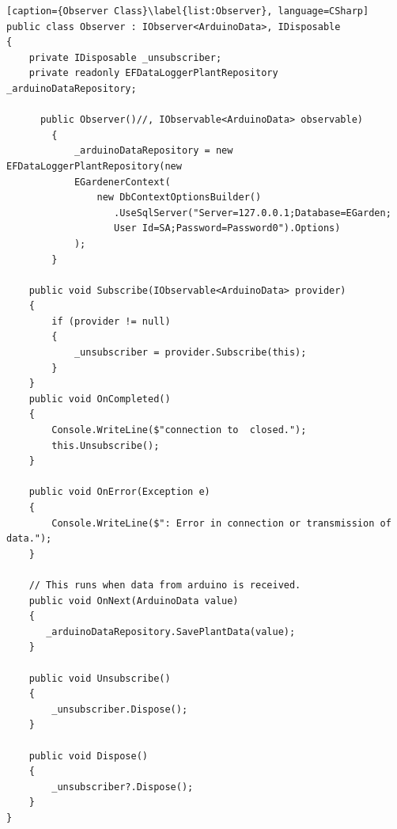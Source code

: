 \documentclass[a4paper,12pt,twoside,openright,titlepage]{book}
\begin{document}
\begin{lstlisting}[caption={Observer Class}\label{list:Observer}, language=CSharp]
public class Observer : IObserver<ArduinoData>, IDisposable
{
	private IDisposable _unsubscriber;
    private readonly EFDataLoggerPlantRepository _arduinoDataRepository;

	  public Observer()//, IObservable<ArduinoData> observable)
        {
            _arduinoDataRepository = new EFDataLoggerPlantRepository(new
            EGardenerContext(
                new DbContextOptionsBuilder()
                   .UseSqlServer("Server=127.0.0.1;Database=EGarden;
                   User Id=SA;Password=Password0").Options)
            );
        }

	public void Subscribe(IObservable<ArduinoData> provider)
    {
		if (provider != null)
		{	     
	        _unsubscriber = provider.Subscribe(this);
        }
	}
	public void OnCompleted()
    {
		Console.WriteLine($"connection to  closed.");
	    this.Unsubscribe();
    }

	public void OnError(Exception e)
	{
        Console.WriteLine($": Error in connection or transmission of data.");
	}

    // This runs when data from arduino is received.
	public void OnNext(ArduinoData value)
    {
       _arduinoDataRepository.SavePlantData(value);
    }

    public void Unsubscribe()
	{
        _unsubscriber.Dispose();
	}

	public void Dispose()
    {
		_unsubscriber?.Dispose();
	}
}
\end{lstlisting}
\end{document}
